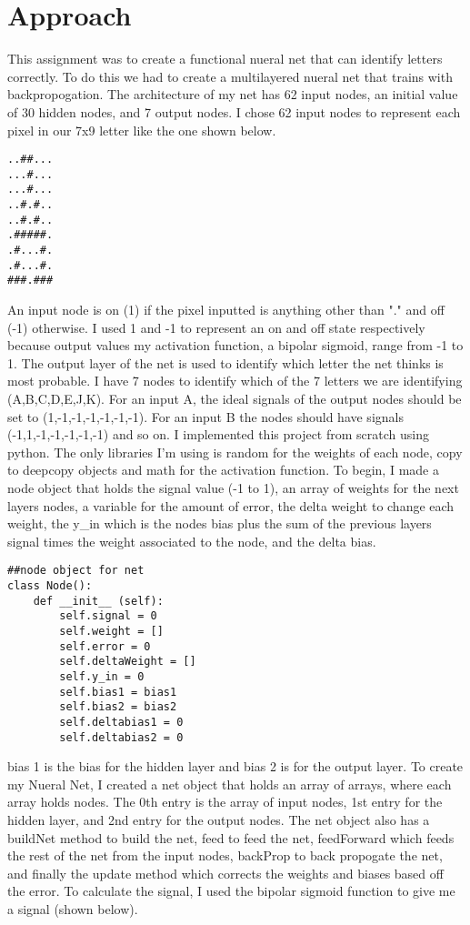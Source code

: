 \documentclass[letterpaper]{article}
\begin{document}
\section{Approach}
This assignment was to create a functional nueral net that can identify letters correctly. To do this we had to create a multilayered nueral net that trains with backpropogation. The architecture of my net has 62 input nodes, an initial value of 30 hidden nodes, and 7 output nodes. I chose 62 input nodes to represent each pixel in our 7x9 letter like the one shown below.
\begin{lstlisting}
..##...
...#...
...#...
..#.#..
..#.#..
.#####.
.#...#.
.#...#.
###.###
\end{lstlisting}
An input node is on (1) if the pixel inputted is anything other than "." and off (-1) otherwise. I used 1 and -1 to represent an on and off state respectively because output values my activation function, a bipolar sigmoid, range from -1 to 1. The output layer of the net is used to identify which letter the net thinks is most probable. I have 7 nodes to identify which of the 7 letters we are identifying (A,B,C,D,E,J,K). For an input A, the ideal signals of the output nodes should be set to (1,-1,-1,-1,-1,-1,-1). For an input B the nodes should have signals (-1,1,-1,-1,-1,-1,-1) and so on. I implemented this project from scratch using python. The only libraries I'm using is random for the weights of each node, copy to deepcopy objects and math for the activation function. To begin, I made a node object that holds the signal value (-1 to 1), an array of weights for the next layers nodes, a variable for the amount of error, the delta weight to change each weight, the y\_in which is the nodes bias plus the sum of the previous layers signal times the weight associated to the node, and the delta bias. 
\begin{lstlisting}
##node object for net
class Node():
    def __init__ (self):
        self.signal = 0
        self.weight = []
        self.error = 0
        self.deltaWeight = []
        self.y_in = 0
        self.bias1 = bias1
        self.bias2 = bias2
        self.deltabias1 = 0
        self.deltabias2 = 0
\end{lstlisting}
bias 1 is the bias for the hidden layer and bias 2 is for the output layer. To create my Nueral Net, I created a net object that holds an array of arrays, where each array holds nodes. The 0th entry is the array of input nodes, 1st entry for the hidden layer, and 2nd entry for the output nodes. The net object also has a buildNet method to build the net, feed to feed the net, feedForward which feeds the rest of the net from the input nodes, backProp to back propogate the net, and finally the update method which corrects the weights and biases based off the error. To calculate the signal, I used the bipolar sigmoid function to give me a signal (shown below).
\end{document}
